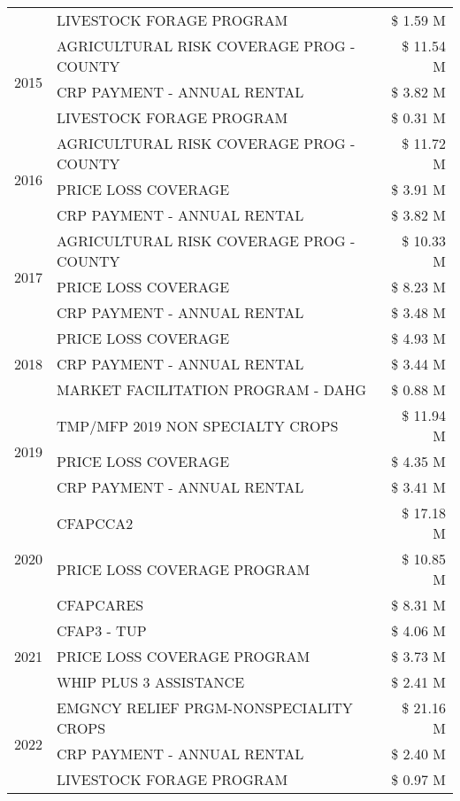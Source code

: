\begin{tabular}{llr}
 & LIVESTOCK FORAGE PROGRAM & \$ 1.59 M \\
\cline{1-3}
\multirow[t]{3}{*}{2015} & AGRICULTURAL RISK COVERAGE PROG - COUNTY & \$ 11.54 M \\
 & CRP PAYMENT - ANNUAL RENTAL & \$ 3.82 M \\
 & LIVESTOCK FORAGE PROGRAM & \$ 0.31 M \\
\cline{1-3}
\multirow[t]{3}{*}{2016} & AGRICULTURAL RISK COVERAGE PROG - COUNTY & \$ 11.72 M \\
 & PRICE LOSS COVERAGE & \$ 3.91 M \\
 & CRP PAYMENT - ANNUAL RENTAL & \$ 3.82 M \\
\cline{1-3}
\multirow[t]{3}{*}{2017} & AGRICULTURAL RISK COVERAGE PROG - COUNTY & \$ 10.33 M \\
 & PRICE LOSS COVERAGE & \$ 8.23 M \\
 & CRP PAYMENT - ANNUAL RENTAL & \$ 3.48 M \\
\cline{1-3}
\multirow[t]{3}{*}{2018} & PRICE LOSS COVERAGE & \$ 4.93 M \\
 & CRP PAYMENT - ANNUAL RENTAL & \$ 3.44 M \\
 & MARKET FACILITATION PROGRAM - DAHG & \$ 0.88 M \\
\cline{1-3}
\multirow[t]{3}{*}{2019} & TMP/MFP 2019 NON SPECIALTY CROPS & \$ 11.94 M \\
 & PRICE LOSS COVERAGE & \$ 4.35 M \\
 & CRP PAYMENT - ANNUAL RENTAL & \$ 3.41 M \\
\cline{1-3}
\multirow[t]{3}{*}{2020} & CFAPCCA2 & \$ 17.18 M \\
 & PRICE LOSS COVERAGE PROGRAM & \$ 10.85 M \\
 & CFAPCARES & \$ 8.31 M \\
\cline{1-3}
\multirow[t]{3}{*}{2021} & CFAP3 - TUP & \$ 4.06 M \\
 & PRICE LOSS COVERAGE PROGRAM & \$ 3.73 M \\
 & WHIP PLUS 3 ASSISTANCE & \$ 2.41 M \\
\cline{1-3}
\multirow[t]{3}{*}{2022} & EMGNCY RELIEF PRGM-NONSPECIALITY CROPS & \$ 21.16 M \\
 & CRP PAYMENT - ANNUAL RENTAL & \$ 2.40 M \\
 & LIVESTOCK FORAGE PROGRAM & \$ 0.97 M \\
\cline{1-3}
\bottomrule
\end{tabular}
